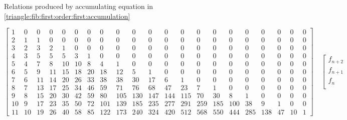 \documentclass[a4paper,dottedtoc,headinclude,footinclude]{report} %
\theoremstyle{plain}
\begin{document}
\begin{table}
        \caption{Relations produced by accumulating equation in 
            \autoref{triangle:fib:first:order:first:accumulation}}
        \label{triangle:fib:first:order:second:accumulation}
    \end{table}

    \begin{table}
        \begin{displaymath}
            \left[
                \begin{array}{ccccccccccccccccccccc}
                    1 & 0 & 0 & 0 & 0 & 0 & 0 & 0 & 0 & 0 & 0 & 0 & 0 & 0 & 0 & 0 & 0 & 0 & 0 & 0 & 0\\
                    2 & 1 & 1 & 0 & 0 & 0 & 0 & 0 & 0 & 0 & 0 & 0 & 0 & 0 & 0 & 0 & 0 & 0 & 0 & 0 & 0\\
                    3 & 2 & 3 & 2 & 1 & 0 & 0 & 0 & 0 & 0 & 0 & 0 & 0 & 0 & 0 & 0 & 0 & 0 & 0 & 0 & 0\\
                    4 & 3 & 5 & 5 & 5 & 3 & 1 & 0 & 0 & 0 & 0 & 0 & 0 & 0 & 0 & 0 & 0 & 0 & 0 & 0 & 0\\
                    5 & 4 & 7 & 8 & 10 & 10 & 8 & 4 & 1 & 0 & 0 & 0 & 0 & 0 & 0 & 0 & 0 & 0 & 0 & 0 & 0\\
                    6 & 5 & 9 & 11 & 15 & 18 & 20 & 18 & 12 & 5 & 1 & 0 & 0 & 0 & 0 & 0 & 0 & 0 & 0 & 0 & 0\\
                    7 & 6 & 11 & 14 & 20 & 26 & 33 & 38 & 38 & 30 & 17 & 6 & 1 & 0 & 0 & 0 & 0 & 0 & 0 & 0 & 0\\
                    8 & 7 & 13 & 17 & 25 & 34 & 46 & 59 & 71 & 76 & 68 & 47 & 23 & 7 & 1 & 0 & 0 & 0 & 0 & 0 & 0\\
                    9 & 8 & 15 & 20 & 30 & 42 & 59 & 80 & 105 & 130 & 147 & 144 & 115 & 70 & 30 & 8 & 1 & 0 & 0 & 0 & 0\\
                    10 & 9 & 17 & 23 & 35 & 50 & 72 & 101 & 139 & 185 & 235 & 277 & 291 & 259 & 185 & 100 & 38 & 9 & 1 & 0 & 0\\
                    11 & 10 & 19 & 26 & 40 & 58 & 85 & 122 & 173 & 240 & 324 & 420 & 512 & 568 & 550 & 444 & 285 & 138 & 47 & 10 & 1
                \end{array}
                \right]  \quad %
                \left[
                    \begin{array}{c}
                        f_{n + 2}\\
                        f_{n + 1}\\
                        f_{n}\\

\end{array}
\end{displaymath}
\end{table}
\end{document}
